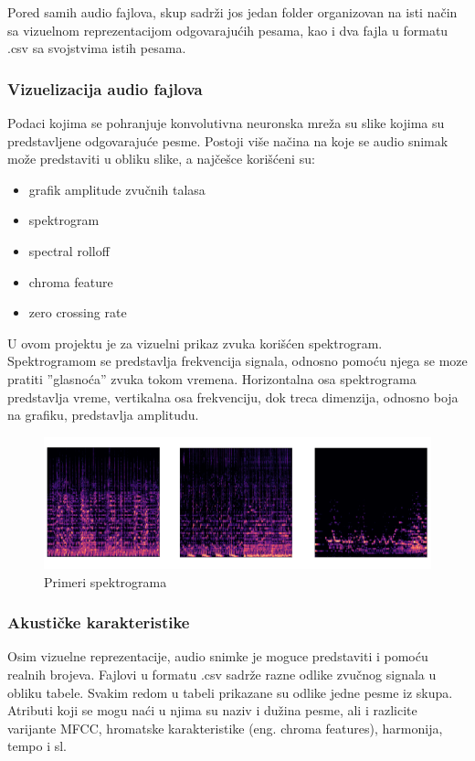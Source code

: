 \documentclass{article}
\begin{document}
Pored samih audio fajlova, skup sadrži jos jedan folder organizovan na isti način sa vizuelnom reprezentacijom odgovarajućih pesama, kao i dva fajla u formatu .csv sa svojstvima istih pesama.

\subsubsection{Vizuelizacija audio fajlova}
Podaci kojima se pohranjuje konvolutivna neuronska mreža su slike kojima su predstavljene odgovarajuće pesme. Postoji više načina na koje se audio snimak može predstaviti u obliku slike, a najčešce korišćeni su:
\begin{itemize}
    \item grafik amplitude zvučnih talasa
    \item spektrogram
    \item spectral rolloff
    \item chroma feature
    \item zero crossing rate
\end{itemize}

U ovom projektu je za vizuelni prikaz zvuka korišćen spektrogram. Spektrogramom se predstavlja frekvencija signala, odnosno pomoću njega se moze pratiti ''glasnoća'' zvuka tokom vremena. Horizontalna osa spektrograma predstavlja vreme, vertikalna osa frekvenciju, dok treca dimenzija, odnosno boja na grafiku, predstavlja amplitudu.

\begin{figure}[h]
\centering
\includegraphics[scale=0.75]{spectrograms}
\caption{Primeri spektrograma}
\end{figure}



\subsubsection{Akustičke karakteristike}

Osim vizuelne reprezentacije, audio snimke je moguce predstaviti i pomoću realnih brojeva. Fajlovi u formatu .csv sadrže razne odlike zvučnog signala u obliku tabele. Svakim redom u tabeli prikazane su odlike jedne pesme iz skupa. Atributi koji se mogu naći u njima su naziv i dužina pesme, ali i razlicite varijante MFCC, hromatske karakteristike (eng. chroma features), harmonija, tempo i sl. 
\end{document}
